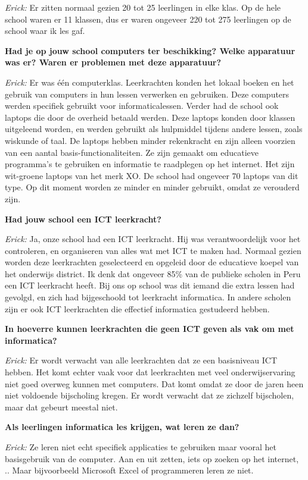 \textit{Erick:} Er zitten normaal gezien 20 tot 25 leerlingen in elke klas. Op de hele school waren er 11 klassen, dus er waren ongeveer 220 tot 275 leerlingen op de school waar ik les gaf. %

\textbf{Had je op jouw school computers ter beschikking? Welke apparatuur was er? Waren er problemen met deze apparatuur?}

\textit{Erick:} Er was één computerklas. Leerkrachten konden het lokaal boeken en het gebruik van computers in hun lessen verwerken en gebruiken. Deze computers werden specifiek gebruikt voor informaticalessen. Verder had de school ook laptops die door de overheid betaald werden. Deze laptops konden door klassen uitgeleend worden, en werden gebruikt als hulpmiddel tijdens andere lessen, zoals wiskunde of taal. De laptops hebben minder rekenkracht en zijn alleen voorzien van een aantal basis-functionaliteiten. Ze zijn gemaakt om educatieve programma's te gebruiken en informatie te raadplegen op het internet. Het zijn wit-groene laptops van het merk XO. De school had ongeveer 70 laptops van dit type. Op dit moment worden ze minder en minder gebruikt, omdat ze verouderd  zijn.

\textbf{Had jouw school een ICT leerkracht?}

\textit{Erick:} Ja, onze school had een ICT leerkracht. Hij was verantwoordelijk voor het controleren, en organiseren van alles wat met ICT te maken had. Normaal gezien worden deze leerkrachten geselecteerd en opgeleid door de educatieve koepel van het onderwijs district. Ik denk dat ongeveer 85\% van de publieke scholen in Peru een ICT leerkracht heeft. Bij ons op school was dit iemand die extra lessen had gevolgd, en zich had bijgeschoold tot leerkracht informatica. In andere scholen zijn er ook ICT leerkrachten die effectief informatica gestudeerd hebben.

\textbf{In hoeverre kunnen leerkrachten die geen ICT geven als vak om met informatica?}

\textit{Erick:} Er wordt verwacht van alle leerkrachten dat ze een basisniveau ICT hebben. Het komt echter vaak voor dat leerkrachten met veel onderwijservaring niet goed overweg kunnen met computers. Dat komt omdat ze door de jaren heen niet voldoende bijscholing kregen. Er wordt verwacht dat ze zichzelf bijscholen, maar dat gebeurt meestal niet.

\textbf{Als leerlingen informatica les krijgen, wat leren ze dan?}

\textit{Erick:} Ze leren niet echt specifiek applicaties te gebruiken maar vooral het basisgebruik van de computer. Aan en uit zetten, iets op zoeken op het internet, .. Maar bijvoorbeeld Microsoft Excel of programmeren leren ze niet.

